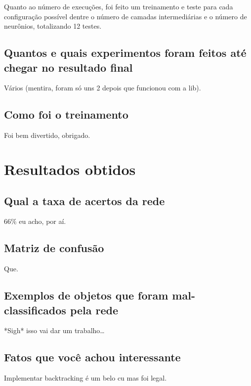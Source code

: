 \documentclass[twocolumn]{article}
\begin{document}
    Quanto ao número de execuções, foi feito um treinamento e teste para cada
    configuração possível dentre o número de camadas intermediárias e o número
    de neurônios, totalizando 12 testes.

    \subsection{Quantos e quais experimentos foram feitos até chegar no resultado final}

    Vários (mentira, foram só uns 2 depois que funcionou com a lib).

    \subsection{Como foi o treinamento}

    Foi bem divertido, obrigado.

    \section{Resultados obtidos}

    \subsection{Qual a taxa de acertos da rede}

    66\% eu acho, por aí.

    \subsection{Matriz de confusão}

    Que.

    \subsection{Exemplos de objetos que foram mal-classificados pela rede}

    *Sigh* isso vai dar um trabalho\ldots

    \subsection{Fatos que você achou interessante}

    Implementar backtracking é um belo cu mas foi legal.

    
    
    \nocite{*}
\end{document}
